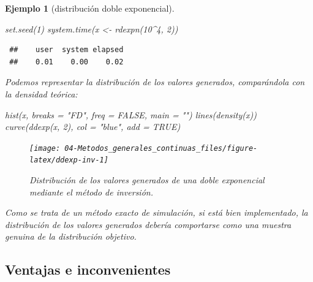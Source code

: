 \documentclass[
  10pt,
]{book}
\newenvironment{Shaded}{\begin{snugshade}}{\end{snugshade}}
\newcommand{\AttributeTok}[1]{\textcolor[rgb]{0.77,0.63,0.00}{#1}}
\newcommand{\ConstantTok}[1]{\textcolor[rgb]{0.00,0.00,0.00}{#1}}
\newcommand{\DecValTok}[1]{\textcolor[rgb]{0.00,0.00,0.81}{#1}}
\newcommand{\FunctionTok}[1]{\textcolor[rgb]{0.00,0.00,0.00}{#1}}
\newcommand{\NormalTok}[1]{#1}
\newcommand{\OtherTok}[1]{\textcolor[rgb]{0.56,0.35,0.01}{#1}}
\newcommand{\SpecialCharTok}[1]{\textcolor[rgb]{0.00,0.00,0.00}{#1}}
\newcommand{\StringTok}[1]{\textcolor[rgb]{0.31,0.60,0.02}{#1}}
\theoremstyle{break}
\newtheorem{example}{Ejemplo}[chapter]
\theoremstyle{nonumberplain}
\begin{document}
\begin{example}[distribución doble exponencial]
\begin{Shaded}
\begin{Highlighting}[]
\FunctionTok{set.seed}\NormalTok{(}\DecValTok{1}\NormalTok{)}
\FunctionTok{system.time}\NormalTok{(x }\OtherTok{\textless{}{-}} \FunctionTok{rdexpn}\NormalTok{(}\DecValTok{10}\SpecialCharTok{\^{}}\DecValTok{4}\NormalTok{, }\DecValTok{2}\NormalTok{))}
\end{Highlighting}
\end{Shaded}

\begin{verbatim}
 ##    user  system elapsed 
 ##    0.01    0.00    0.02
\end{verbatim}

Podemos representar la distribución de los valores generados, comparándola con la densidad teórica:

\begin{Shaded}
\begin{Highlighting}[]
\FunctionTok{hist}\NormalTok{(x, }\AttributeTok{breaks =} \StringTok{"FD"}\NormalTok{, }\AttributeTok{freq =} \ConstantTok{FALSE}\NormalTok{, }\AttributeTok{main =} \StringTok{""}\NormalTok{)}
\FunctionTok{lines}\NormalTok{(}\FunctionTok{density}\NormalTok{(x))}
\FunctionTok{curve}\NormalTok{(}\FunctionTok{ddexp}\NormalTok{(x, }\DecValTok{2}\NormalTok{), }\AttributeTok{col =} \StringTok{"blue"}\NormalTok{, }\AttributeTok{add =} \ConstantTok{TRUE}\NormalTok{)}
\end{Highlighting}
\end{Shaded}

\begin{figure}[!htbp]

{\centering \texttt{[image: 04-Metodos\_generales\_continuas\_files/figure-latex/ddexp-inv-1]} 

}

\caption{Distribución de los valores generados de una doble exponencial mediante el método de inversión.}\label{fig:ddexp-inv}
\end{figure}

Como se trata de un método exacto de simulación, si está bien implementado, la distribución de los valores generados debería comportarse como una muestra genuina de la distribución objetivo.
\end{example}

\hypertarget{ventajas-e-inconvenientes}{%
\subsection{Ventajas e inconvenientes}\label{ventajas-e-inconvenientes}}
\end{document}

